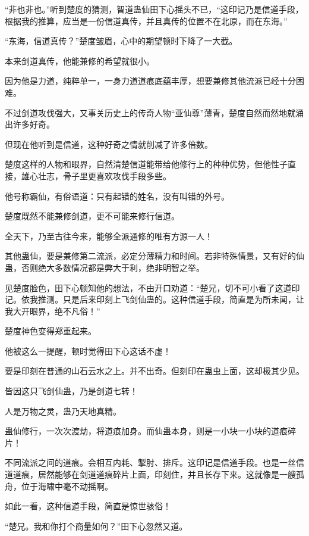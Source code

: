 
\begin{this_body}



“非也非也。”听到楚度的猜测，智道蛊仙田下心摇头不已，“这印记乃是信道手段，根据我的推算，应当是一份信道真传，并且真传的位置不在北原，而在东海。”

“东海，信道真传？”楚度皱眉，心中的期望顿时下降了一大截。

本来剑道真传，他能兼修的希望就很小。

因为他是力道，纯粹单一，一身力道道痕底蕴丰厚，想要兼修其他流派已经十分困难。

不过剑道攻伐强大，又事关历史上的传奇人物“亚仙尊”薄青，楚度自然而然地就涌出许多好奇。

但现在他听到是信道，这种好奇之情就削减了许多倍数。

楚度这样的人物和眼界，自然清楚信道能带给他修行上的种种优势，但他性子直接，雄心壮志，骨子里更喜欢攻伐手段多些。

他号称霸仙，有俗语道：只有起错的姓名，没有叫错的外号。

楚度既然不能兼修剑道，更不可能来修行信道。

全天下，乃至古往今来，能够全派通修的唯有方源一人！

其他蛊仙，要是兼修第二流派，必定分薄精力和时间。若非特殊情景，又有好的仙蛊，否则绝大多数情况都是弊大于利，绝非明智之举。

见楚度脸色，田下心顿知他的想法，不由开口劝道：“楚兄，切不可小看了这道印记。依我推测。只是后来印刻上飞剑仙蛊的。这种信道手段，简直是为所未闻，让我大开眼界，绝不凡俗！”

楚度神色变得郑重起来。

他被这么一提醒，顿时觉得田下心这话不虚！

要是印刻在普通的山石云水之上。并不出奇。但刻印在蛊虫上面，这却极其少见。

皆因这只飞剑仙蛊，乃是剑道七转！

人是万物之灵，蛊乃天地真精。

蛊仙修行，一次次渡劫，将道痕加身。而仙蛊本身，则是一小块一小块的道痕碎片！

不同流派之间的道痕。会相互内耗、掣肘、排斥。这印记是信道手段。也是一丝信道道痕，居然能够在剑道道痕碎片上面，印刻住，并且长存下来。这就像是一艘孤舟，位于海啸中毫不动摇啊。

如此一看，这种信道手段，简直是惊世骇俗！

“楚兄。我和你打个商量如何？”田下心忽然又道。


\end{this_body}
